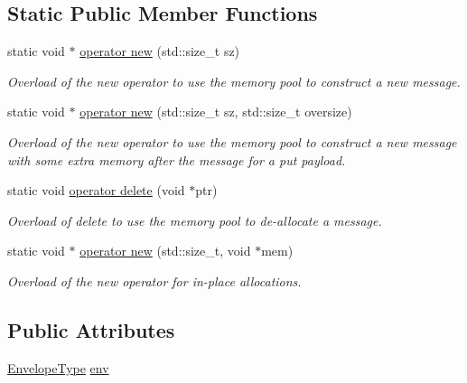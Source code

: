 \subsection*{Static Public Member Functions}
\begin{DoxyCompactItemize}
\item 
static void $\ast$ \hyperlink{structvt_1_1messaging_1_1_active_msg_ac79d16742251f19ed94f9725ed866f64}{operator new} (std\+::size\+\_\+t sz)
\begin{DoxyCompactList}\small\item\em Overload of the new operator to use the memory pool to construct a new message. \end{DoxyCompactList}\item 
static void $\ast$ \hyperlink{structvt_1_1messaging_1_1_active_msg_ac13140f75e5238670c81589a84881ac1}{operator new} (std\+::size\+\_\+t sz, std\+::size\+\_\+t oversize)
\begin{DoxyCompactList}\small\item\em Overload of the new operator to use the memory pool to construct a new message with some extra memory after the message for a put payload. \end{DoxyCompactList}\item 
static void \hyperlink{structvt_1_1messaging_1_1_active_msg_a37cd0731f99157266333772f501d390d}{operator delete} (void $\ast$ptr)
\begin{DoxyCompactList}\small\item\em Overload of delete to use the memory pool to de-\/allocate a message. \end{DoxyCompactList}\item 
static void $\ast$ \hyperlink{structvt_1_1messaging_1_1_active_msg_a03927a2881ef7e3308765361cb89c606}{operator new} (std\+::size\+\_\+t, void $\ast$mem)
\begin{DoxyCompactList}\small\item\em Overload of the new operator for in-\/place allocations. \end{DoxyCompactList}\end{DoxyCompactItemize}
\subsection*{Public Attributes}
\begin{DoxyCompactItemize}
\item 
\hyperlink{structvt_1_1messaging_1_1_active_msg_a6e2b0541c25f7290555bf50d7cc05874}{Envelope\+Type} \hyperlink{structvt_1_1messaging_1_1_active_msg_ae3f8937b2c95f548f1a3c3340b887c09}{env}
\end{DoxyCompactItemize}


